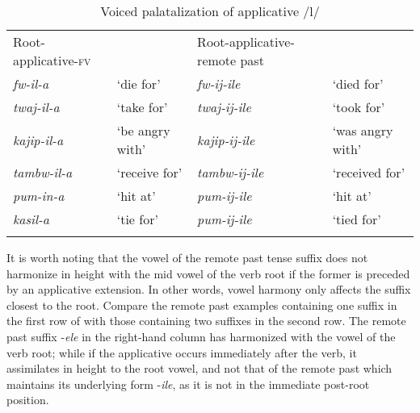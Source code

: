 \documentclass[output=paper]{langsci/langscibook}
\begin{document}
\begin{table}
\begin{tabular}{llll}
\lsptoprule
Root-applicative-\textsc{fv} &  & Root-applicative-remote past & \\
\textit{fw-il-a} & `die for' & \textit{fw-ij-ile} & `died for' \\
\textit{twaj-il-a} & `take for' & \textit{twaj-ij-ile} & `took for' \\
\textit{kajip-il-a} & `be angry with' & \textit{kajip-ij-ile} & `was angry with' \\
\textit{tambw-il-a} & `receive for' & \textit{tambw-ij-ile} & `received for' \\
\textit{pum-in-a} & `hit at' & \textit{pum-ij-ile} & `hit at' \\
\textit{kasil-a} & `tie for' & \textit{pum-ij-ile} & `tied for' \\

\lspbottomrule
\end{tabular}

\caption{Voiced palatalization of applicative /l/}
\label{tab:13.kawasha}
\end{table}

It is worth noting that the vowel of the remote past tense suffix does not harmonize in height with the mid vowel of the verb root if the former is preceded by an applicative extension. In other words, vowel harmony only affects the suffix closest to the root. Compare the remote past examples containing one suffix in the first row of  with those containing two suffixes in the second row. The remote past suffix -\textit{ele} in the right-hand column has harmonized with the vowel of the verb root; while if the applicative occurs immediately after the verb, it assimilates in height to the root  vowel, and not that of the remote past which maintains its underlying form -\textit{ile}, as it is not in the immediate post-root position.
 
\end{document}
